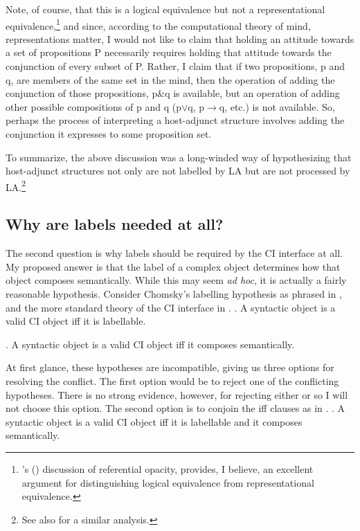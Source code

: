 \documentclass[MilwayThesis]{subfiles}
\begin{document}
Note, of course, that this is a logical equivalence but not a representational equivalence,\footnote{
	\citeauthor{fodor1975language}'s (\citeyear[50--100]{fodor2010lot}) discussion of referential opacity, provides, I believe, an excellent argument for distinguishing logical equivalence from representational equivalence.
} and since, according to the computational theory of mind, representations matter, I would not like to claim that holding an attitude towards a set of propositions P necessarily requires holding that attitude towards the conjunction of every subset of P.
Rather, I claim that if two propositions, p and q, are members of the same set in the mind, then the operation of adding the conjunction of those propositions, p\&q is available, but an operation of adding other possible compositions of p and q (p$\vee$q, p$\rightarrow$q, etc.) is not available.
So, perhaps the process of interpreting a host-adjunct structure involves adding the conjunction it expresses to some proposition set.

To summarize, the above discussion was a long-winded way of hypothesizing that host-adjunct structures not only are not labelled by LA but are not processed by LA.\footnote{See also \textcite{citko2005nature} for a similar analysis.}

\subsection{Why are labels needed at all?}\label{sec:label-sem}
The second question is why labels should be required by the CI interface at all.
My proposed answer is that the label of a complex object determines how that object composes semantically.
While this may seem \textit{ad hoc}, it is actually a fairly reasonable hypothesis.
Consider Chomsky's labelling hypothesis as phrased in \Next, and the more standard theory of the CI interface in \NNext.
\ex. A syntactic object is a valid CI object iff it is labellable.

\ex. A syntactic object is a valid CI object iff it composes semantically.

At first glance, these hypotheses are incompatible, giving us three options for resolving the conflict.
The first option would be to reject one of the conflicting hypotheses.
There is no strong evidence, however, for rejecting either \LLast or \Last so I will not choose this option.
The second option is to conjoin the iff clauses as in \Next.
\ex. A syntactic object is a valid CI object iff it is labellable and it composes semantically.
\end{document}
